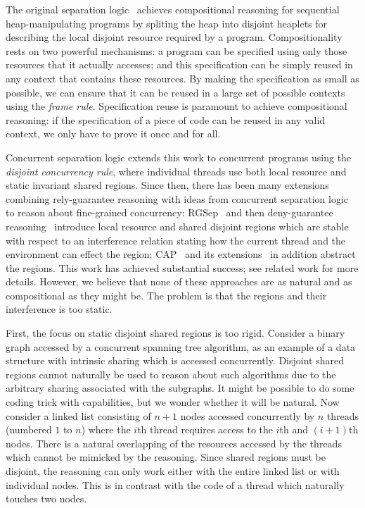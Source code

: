 The original separation logic~\cite{rey02,seplog} achieves
compositional reasoning for sequential heap-manipulating programs by
spliting the heap into disjoint heaplets for describing the local
disjoint resource required by a program. Compositionality rests on two
powerful mechanisms: a program  can be specified using only those
resources that it actually accesses; and this specification can be
simply reused in any context that contains these resources.
By making the specification
as small  as possible, we can ensure that it
can be reused in a large set of possible contexts using  the {\em frame
rule}. 
 Specification reuse is paramount to achieve compositional
reasoning: if the specification of a piece of code can be reused in
any valid context, we only have  to prove it once and for all. 


Concurrent separation logic extends this work to concurrent programs
using the {\em disjoint concurrency rule}, where individual threads
use both local resource and static invariant shared regions. Since
then, there has been many extensions combining rely-guarantee
reasoning with ideas from concurrent separation logic to reason about
fine-grained concurrency: RGSep~\cite{viktor-marriage} and then deny-guarantee reasoning~\cite{dg}
introduce local resource and shared disjoint regions which are stable
with respect to an interference relation stating how the current
thread and the environment can effect the region; CAP~\cite{cap-ecoop10} and its
extensions~\cite{hocap,icap,tada} in addition abstract the regions. This work has achieved substantial
success; see related work for more details. However, we believe that
none of these approaches are as natural and as  compositional as they
might be.  The problem is that the regions and their interference is
too static. 

First, the focus on static disjoint shared regions is too rigid.
Consider a binary graph accessed by a concurrent spanning tree
algorithm, as an example of a data structure with intrinsic sharing
which is accessed concurrently. Disjoint shared regions cannot
naturally be used to reason about such algorithms due to the arbitrary
sharing associated with the subgraphs. It might be possible to do some
coding trick with capabilities, but we wonder whether it will be
natural. Now consider a linked list consisting of $n+1$ nodes accessed
concurrently by $n$ threads (numbered $1$ to $n$) where the $i$th
thread requires access to the $i$th and $(i+1)$th nodes.  There is a
natural overlapping of the resources accessed by the threads which
cannot be mimicked by the reasoning. Since shared regions must be
disjoint, the reasoning can only work either with the entire linked
list or with individual nodes. This is in contrast with the code of a
thread which naturally touches two nodes.



